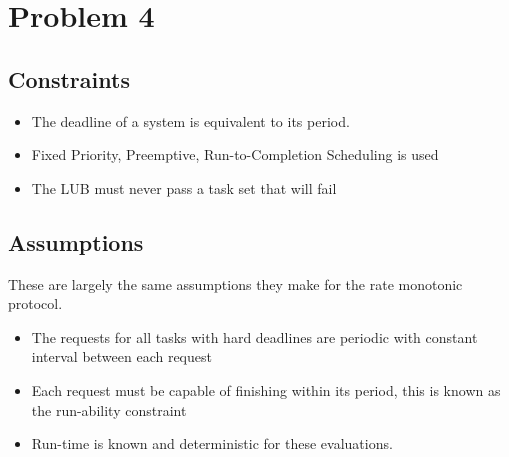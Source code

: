 \documentclass{article}
\begin{document}
\section*{Problem 4}
\subsection*{Constraints}
\begin{itemize}
    \item The deadline of a system is equivalent to its period. 
    \item Fixed Priority, Preemptive, Run-to-Completion Scheduling is used
    \item The LUB must never pass a task set that will fail
\end{itemize}
\subsection*{Assumptions}
These are largely the same assumptions they make for the rate monotonic protocol.
\begin{itemize}
    \item The requests for all tasks with hard deadlines are periodic with constant interval between each request
    \item Each request must be capable of finishing within its period, this is known as the run-ability constraint
    \item Run-time is known and deterministic for these evaluations. 
\end{itemize}
\end{document}
